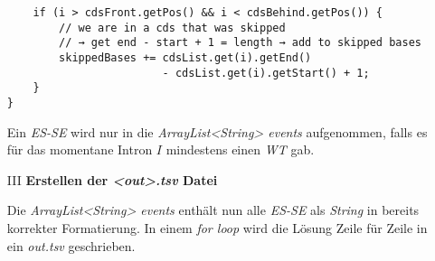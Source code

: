 \documentclass[12pt]{article}
\begin{document}
\begin{enumerate}
\begin{verbatim}
    if (i > cdsFront.getPos() && i < cdsBehind.getPos()) {
        // we are in a cds that was skipped
        // → get end - start + 1 = length → add to skipped bases
        skippedBases += cdsList.get(i).getEnd() 
                        - cdsList.get(i).getStart() + 1;
    }
}
    \end{verbatim}
    Ein \textit{ES-SE} wird nur in die \textit{ArrayList<String> events} aufgenommen, falls es für das momentane
    Intron $I$ mindestens einen \textit{WT} gab.

    \item[III] \textbf{Erstellen der \textit{<out>.tsv} Datei}

    Die \textit{ArrayList<String> events} enthält nun alle \textit{ES-SE} als \textit{String} in bereits
    korrekter Formatierung. In einem \textit{for loop} wird die Lösung Zeile für Zeile in ein \textit{out.tsv}
    geschrieben.
\end{enumerate}
\newpage
\end{document}

